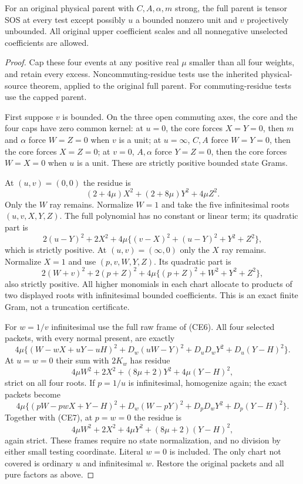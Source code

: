 \begin{theorem}
For an original physical parent with $C,A,\alpha,m$ strong, the full
parent is tensor SOS at every test except possibly $u$ a bounded nonzero
unit and $v$ projectively unbounded. All original upper coefficient
scales and all nonnegative unselected coefficients are allowed.
\end{theorem}
\begin{proof}
Cap these four events at any positive real $\mu$ smaller than all four
weights, and retain every excess. Noncommuting-residue tests use the
inherited physical-source theorem, applied to the original full parent.
For commuting-residue tests use the capped parent.

First suppose $v$ is bounded. On the three open commuting axes, the core
and the four caps have zero common kernel: at $u=0$, the core forces
$X=Y=0$, then $m$ and $\alpha$ force $W=Z=0$ when $v$ is a unit;
at $u=\infty$, $C,A$ force $W=Y=0$, then the core forces $X=Z=0$;
at $v=0$, $A,\alpha$ force $Y=Z=0$, then the core forces $W=X=0$
when $u$ is a unit. These are strictly positive bounded state Grams.

At $(u,v)=(0,0)$ the residue is
\[
 (2+4\mu)X^2+(2+8\mu)Y^2+4\mu Z^2.
\]
Only the $W$ ray remains. Normalize $W=1$ and take the five infinitesimal
roots $(u,v,X,Y,Z)$. The full polynomial has no constant or linear term;
its quadratic part is
\[
 2(u-Y)^2+2X^2+
 4\mu\{(v-X)^2+(u-Y)^2+Y^2+Z^2\},            \tag{CE11}
\]
which is strictly positive. At $(u,v)=(\infty,0)$ only the $X$ ray
remains. Normalize $X=1$ and use $(p,v,W,Y,Z)$. Its quadratic part is
\[
 2(W+v)^2+2(p+Z)^2+
 4\mu\{(p+Z)^2+W^2+Y^2+Z^2\},              \tag{CE12}
\]
also strictly positive. All higher monomials in each chart allocate to
products of two displayed roots with infinitesimal bounded coefficients.
This is an exact finite Gram, not a truncation certificate.

For $w=1/v$ infinitesimal use the full raw frame of (CE6). All four
selected packets, with every normal present, are exactly
\[
 4\mu\{(W-wX+uY-uH)^2+D_w(uW-Y)^2
              +D_uD_wY^2+D_u(Y-H)^2\}.        \tag{CE13}
\]
At $u=w=0$ their sum with $2K_w$ has residue
\[
 4\mu W^2+2X^2+(8\mu+2)Y^2+4\mu(Y-H)^2,    \tag{CE14}
\]
strict on all four roots. If $p=1/u$ is infinitesimal, homogenize again;
the exact packets become
\[
 4\mu\{(pW-pwX+Y-H)^2+D_w(W-pY)^2
              +D_pD_wY^2+D_p(Y-H)^2\}.        \tag{CE15}
\]
Together with (CE7), at $p=w=0$ the residue is
\[
 4\mu W^2+2X^2+4\mu Y^2+(8\mu+2)(Y-H)^2,    \tag{CE16}
\]
again strict. These frames require no state normalization, and no
division by either small testing coordinate. Literal $w=0$ is included.
The only chart not covered is ordinary $u$ and infinitesimal $w$.
Restore the original packets and all pure factors as above.
\end{proof}


